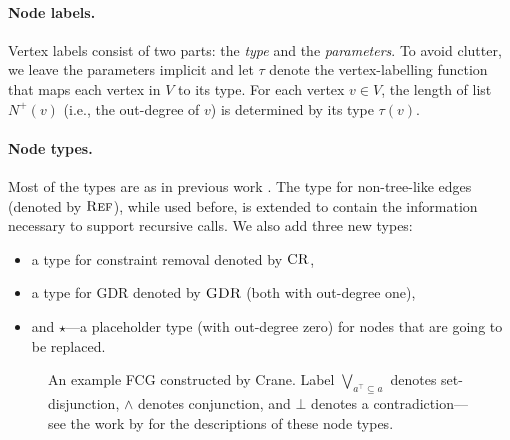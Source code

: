 \paragraph{Node labels.}
Vertex labels consist of two parts: the \emph{type} and the \emph{parameters}.
To avoid clutter, we leave the parameters implicit and let $\tau$ denote the
vertex-labelling function that maps each vertex in $V$ to its type. For each
vertex $v \in V$, the length of list $N^+(v)$ (i.e., the out-degree of $v$) is
determined by its type $\tau(v)$.

\paragraph{Node types.}
Most of the types are as in previous work
\citep{DBLP:conf/nips/Broeck11,DBLP:conf/ijcai/BroeckTMDR11}. The type for
non-tree-like edges (denoted by $\operatorname{\textsc{Ref}}$), while used before, is extended to
contain the information necessary to support recursive calls. We also add three
new types:
\begin{itemize}
  \item a type for constraint removal denoted by $\operatorname{\textsc{CR}}$,
  \item a type for GDR denoted by $\operatorname{\textsc{GDR}}$ (both with out-degree one),
  \item and $\star$---a placeholder type (with out-degree zero) for nodes that are going to be replaced.
\end{itemize}

\begin{figure}[t]
  \centering
  \caption{An example FCG constructed by Crane. Label
    $\bigvee_{a^\top \subseteq a}$ denotes set-disjunction, $\land$ denotes
    conjunction, and $\bot$ denotes a contradiction---see the work by
    \citet{DBLP:conf/ijcai/BroeckTMDR11} for the descriptions of these node
    types.}\label{fig:examplefcg}
\end{figure}

